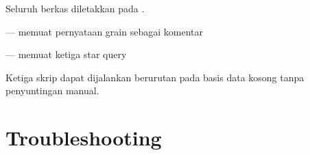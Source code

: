 Seluruh berkas diletakkan pada .

\begin{ceklis}
  \item {}
  \item {} --- memuat pernyataan grain sebagai komentar
  \item {}
  \item {} --- memuat ketiga star query
  \item {}
  \item {}
  \item {}
  \item Ketiga skrip dapat dijalankan berurutan pada basis data kosong tanpa
        penyuntingan manual.
\end{ceklis}

\section{Troubleshooting}

